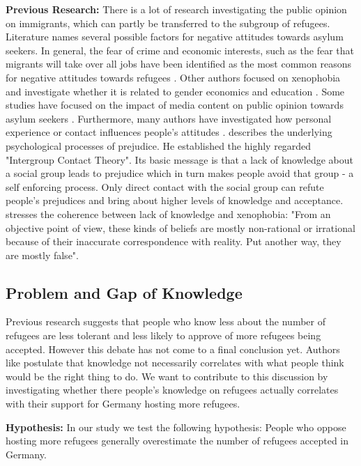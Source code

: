 \documentclass{article}
\begin{document}
\textbf{Previous Research:}
There is a lot of research investigating the public opinion on immigrants, which can partly be transferred to the subgroup of refugees. Literature names several possible factors for negative attitudes towards asylum seekers. In general, the fear of crime and economic interests, such as the fear that migrants will take over all jobs have been identified as the most common reasons for negative attitudes towards refugees \citep{Otto2014}. Other authors focused on xenophobia and investigate whether it is related to gender \citep{Jolly2014} economics and education \citep{Francois2013}. Some studies have focused on the impact of media content on public opinion towards asylum seekers \citep{Boomgaarden2009, Perry1990, Brosius1995}. Furthermore, many authors have investigated how personal experience or contact influences people's attitudes \citep{Pettigrew1997}. \cite{Pettigrew1998} describes the underlying psychological processes of prejudice. He established the highly regarded "Intergroup Contact Theory". Its basic message is that a lack of knowledge about a social group leads to prejudice which in turn makes people avoid that group - a self enforcing process. Only direct contact with the social group can refute people's prejudices and bring about higher levels of knowledge and acceptance. \cite{Rydgren2004} stresses the coherence between lack of knowledge and xenophobia: "From an objective point of view, these kinds of beliefs are mostly non-rational or irrational because of their inaccurate correspondence with reality. Put another way, they are mostly false".

\subsection{Problem and Gap of Knowledge}
Previous research suggests that people who know less about the number of refugees are less tolerant and less likely to approve of more refugees being accepted. However this debate has not come to a final conclusion yet. Authors like \cite{Kahan2014} postulate that knowledge not necessarily correlates with what people think would be the right thing to do. We want to contribute to this discussion by investigating whether there people’s knowledge on refugees actually correlates with their support for Germany hosting more refugees.



\textbf{Hypothesis:}
In our study we test the following hypothesis: People who oppose hosting more refugees generally overestimate the number of refugees accepted in Germany.
\end{document}
